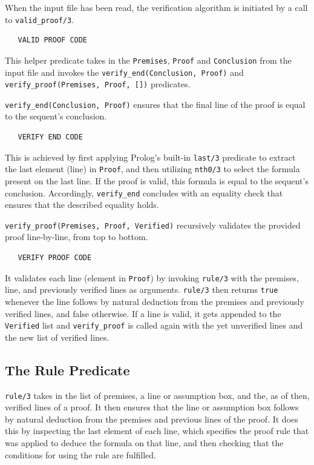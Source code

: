 \documentclass[a4paper, 11pt]{article}
\begin{document}
   When the input file has been read, the verification
   algorithm is initiated by a call to
   \texttt{valid\_proof/3}. 
   
\begin{verbatim}
   VALID PROOF CODE
\end{verbatim}

   This helper predicate takes in the
   \texttt{Premises}, \texttt{Proof} and \texttt{Conclusion}
   from the input file and invokes the 
   \texttt{verify\_end(Conclusion, Proof)} and \\
   \texttt{verify\_proof(Premises, Proof, [])} predicates.
   \bigbreak

   \texttt{verify\_end(Conclusion, Proof)} ensures 
   that the final line of the proof is equal to the
   sequent's conclusion. 
   
\begin{verbatim}
   VERIFY END CODE
\end{verbatim}
   
   This is achieved by
   first applying Prolog's built-in \texttt{last/3}
   predicate to extract the last element (line) in
   \texttt{Proof}, and then utilizing \texttt{nth0/3} 
   to select the formula present on the last line. If
   the proof is valid, this formula is equal to
   the sequent's conclusion. Accordingly, 
   \texttt{verify\_end} concludes with an equality
   check that ensures that the described equality
   holds.
   \bigbreak

   \texttt{verify\_proof(Premises, Proof, Verified)}
   recursively validates the provided proof
   line-by-line, from top to bottom. 
   
\begin{verbatim}
   VERIFY PROOF CODE
\end{verbatim}

   It validates each 
   line (element in \texttt{Proof}) by invoking 
   \texttt{rule/3} with the premises, line, and 
   previously verified lines as arguments. 
   \texttt{rule/3} then returns \texttt{true} whenever 
   the line follows by natural deduction from the 
   premises and previously verified lines, and false
   otherwise. If a line is valid, it gets appended to
   the \texttt{Verified} list and \texttt{verify\_proof}
   is called again with the yet unverified lines and
   the new list of verified lines.

   \subsection{The Rule Predicate}
   \texttt{rule/3} takes in the list of premises, a
   line or assumption box, and the, as of then, 
   verified lines of a proof. It then ensures that
   the line or assumption box follows by natural
   deduction from the premises and previous lines of
   the proof. It does this by inspecting the last
   element of each line, which specifies the
   proof rule that was applied to deduce the
   formula on that line, and then checking that the
   conditions for using the rule are fulfilled.
   \bigbreak
\end{document}
